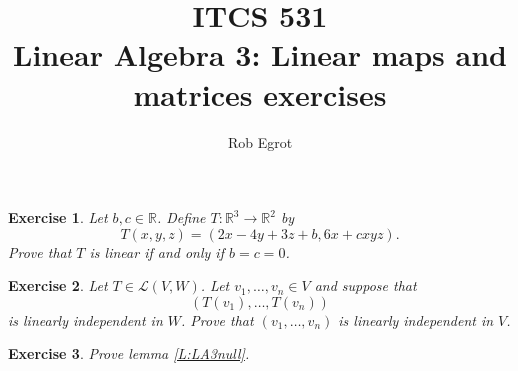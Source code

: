 \documentclass{article}
\title{ITCS 531 \\Linear Algebra 3: Linear maps and matrices exercises}
\author{Rob Egrot}
\date{}
\theoremstyle{plain}
\newtheorem{Q}{Exercise}{\bfseries}{\upshape}
\newcommand{\bR}{\mathbb{R}}
\newcommand{\cL}{\mathcal{L}}
\DeclareMathOperator{\nul}{\mathrm{null}}
\begin{document}
\maketitle

\begin{Q}
Let $b,c\in \bR$. Define $T:\bR^3\to \bR^2$ by 
\[T(x,y,z) = (2x-4y+3z+b, 6x +cxyz).\]
Prove that $T$ is linear if and only if $b=c=0$.
\end{Q}
\begin{comment}
\textbf{Solution:}
If $b=c=0$ then $T(x,y,z) = (2x-4y+3z, 6x)$. We check the conditions of definition \ref{D:LA3map}. First,
\begin{align*}
T(x_1 + x_2,y_1+y_2,z_1+z_2) &= (2(x_1+x_2) - 4(y_1+y_2) +3(z_1+z_2), 6(x_1+x_2))\\
&= (2x_1 - 4y_1 +3z_1, 6x_1) + (2x_2 - 4y_2 +3z_2, 6x_2)\\
&= T(x_1,y_1,z_1) + T(x_2,y_2,z_2).
\end{align*} 
Second,
\begin{align*}
T(\lambda x, \lambda y, \lambda z) &= (2\lambda x-4\lambda y+3 \lambda z, 6\lambda x)\\
&= \lambda (2 x-4 y+3 z, 6 x)\\
&= \lambda T(x,y,z).
\end{align*} 
Conversely, if $T$ is linear then $2T(1,0,0) = T(2,0,0)$, and so $2(2+b,6) = (4+b,12)$. I.e. $(4+2b,12) = (4+b,12)$, and so $b$ must be zero. Also, $T(1,1,1) = T(1,0,0) + T(0,1,1)$. So
\[(2-4+3,6 + c) = (2, 6) + (-4+3,0) = (2-4+3,6),\]
so $c=0$. 
\end{comment}

\begin{Q}
Let $T\in \cL(V,W)$. Let $v_1,\ldots, v_n\in V$ and suppose that \[(T(v_1),\ldots, T(v_n))\] is linearly independent in $W$. Prove that $(v_1,\ldots, v_n)$ is linearly independent in $V$.
\end{Q}
\begin{comment}
\textbf{Solution:}
Suppose $a_1v_1+\ldots+a_nv_n = 0$. Then, as $T$ is linear, we have
\[a_1T(v_1)+\ldots +a_nT(v_n)=T(a_1v_1+\ldots+a_nv_n) = T(0) = 0.\]
As $T(v_1),\ldots, T(v_n)$ is linearly independent, it follows that $a_1=\ldots=a_n=0$. So $(v_1,\ldots, v_n)$ is also linearly independent.   
\end{comment}

\begin{Q}\label{\prefix Q:LA3null}
Prove lemma \ref{L:LA3null}.
\end{Q}
\begin{comment}
\textbf{Solution:}
We have $0\in \nul T$ by lemma \ref{L:LA3zero}. Also, if $T(v) = 0$ then 
\[T(\lambda v) = \lambda T(v) = \lambda.0 = 0,\]
so $\null T$ is closed under scalar multiplication. Also, if $T(u)=T(v)=0$, then
\[T(u+v) = T(u)+T(v) = 0+0 = 0,\]
so $\null T$ is closed under addition.
\end{comment}
\end{document}
